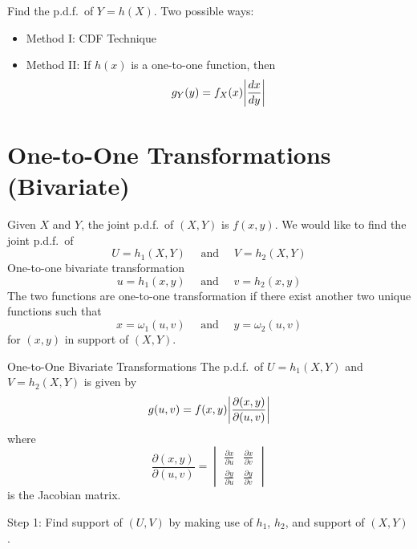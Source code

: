 Find the p.d.f.\ of $ Y=h(X) $. Two possible ways:
\begin{itemize}
    \item Method I\@: CDF Technique
    \item Method II\@: If $ h(x) $ is a one-to-one function,
          then
          \[ g_Y(y)=f_X(x)\abs*{\frac{dx}{dy} } \]
\end{itemize}
\section{One-to-One Transformations (Bivariate)}
Given $ X $ and $ Y $, the joint p.d.f.\ of $ (X,Y) $
is $ f(x,y) $. We would like to find the joint p.d.f.\
of
\[ U=h_1(X,Y)\quad\text{ and }\quad V=h_2(X,Y) \]
One-to-one bivariate transformation
\[ u=h_1(x,y)\quad\text{ and }\quad v=h_2(x,y) \]
The two functions are one-to-one transformation if there exist
another two unique functions such that
\[ x=\omega_1(u,v)\quad\text{ and }\quad y=\omega_2(u,v) \]
for $ (x,y) $ in support of $ (X,Y) $.
\begin{Theorem}{One-to-One Bivariate Transformations}{}
    The p.d.f.\ of $ U=h_1(X,Y) $ and $ V=h_2(X,Y) $ is given by
    \[ g(u,v)=f(x,y)\abs*{\frac{\partial(x,y)}{\partial(u,v)} } \]
    where
    \[ \frac{\partial(x,y)}{\partial(u,v)} =
        \begin{vmatrix}
            \frac{\partial x}{\partial u} & \frac{\partial x}{\partial v} \\
            \frac{\partial y}{\partial u} & \frac{\partial y}{\partial v}
        \end{vmatrix} \]
    is the Jacobian matrix.
\end{Theorem}
Step 1: Find support of $ (U,V) $ by making use of $ h_1 $, $ h_2 $,
and support of $ (X,Y) $.

